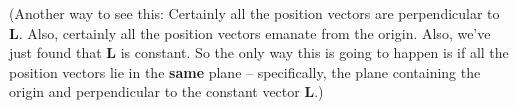 \documentclass[10pt]{article}
\newcommand{\vL}{\mathbf{L}}
\newenvironment{red}{\color{red}}{\ignorespacesafterend}
\begin{document}
\begin{enumerate}[leftmargin=0pt]
\begin{enumerate}
\begin{red}
    (Another way to see this: Certainly all the position vectors are perpendicular to $\vL$. Also, certainly all the position vectors emanate from the origin. Also, we've just found that $\vL$ is constant. So the only way this is going to happen is if all the position vectors lie in the \textbf{same} plane -- specifically, the plane containing the origin and perpendicular to the constant vector $\vL$.)
    \end{red}
\end{enumerate}

\end{enumerate}
	
\end{document}
